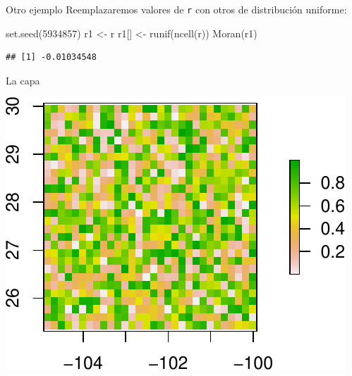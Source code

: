 \documentclass[
  11pt,
  ignorenonframetext,
]{beamer}
\newenvironment{Shaded}{}{}
\newcommand{\DecValTok}[1]{\textcolor[rgb]{0.25,0.63,0.44}{#1}}
\newcommand{\FunctionTok}[1]{\textcolor[rgb]{0.02,0.16,0.49}{#1}}
\newcommand{\NormalTok}[1]{#1}
\newcommand{\OtherTok}[1]{\textcolor[rgb]{0.00,0.44,0.13}{#1}}
\begin{document}
\begin{frame}[fragile]{Otro ejemplo}
\protect\hypertarget{otro-ejemplo}{}
Reemplazaremos valores de \texttt{r} con otros de distribución uniforme:

\begin{Shaded}
\begin{Highlighting}[]
\FunctionTok{set.seed}\NormalTok{(}\DecValTok{5934857}\NormalTok{)}
\NormalTok{r1 }\OtherTok{\textless{}{-}}\NormalTok{ r}
\NormalTok{r1[] }\OtherTok{\textless{}{-}} \FunctionTok{runif}\NormalTok{(}\FunctionTok{ncell}\NormalTok{(r))}
\FunctionTok{Moran}\NormalTok{(r1)}
\end{Highlighting}
\end{Shaded}

\begin{verbatim}
## [1] -0.01034548
\end{verbatim}
\end{frame}

\begin{frame}{La capa}
\protect\hypertarget{la-capa}{}
\begin{center}\includegraphics{Asociacion-espacio_files/figure-beamer/unnamed-chunk-4-1} \end{center}
\end{frame}
\end{document}
